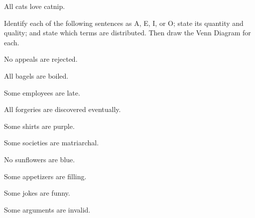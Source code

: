 \begin{exercises}
\item All cats love catnip.


\end{exercises}

\noindent \problempart Identify each of the following sentences as A, E, I, or O; state its quantity and quality; and state which terms are distributed. Then draw the Venn Diagram for each.

\begin{exercises}


\item No appeals are rejected.

\item All bagels are boiled.

\item Some employees are late.

\item All forgeries are discovered eventually.

\item Some shirts are purple.

\item Some societies are matriarchal.

\item No sunflowers are blue.

\item Some appetizers are filling. 

\item Some jokes are funny.

\item Some arguments are invalid. 

\end{exercises}

